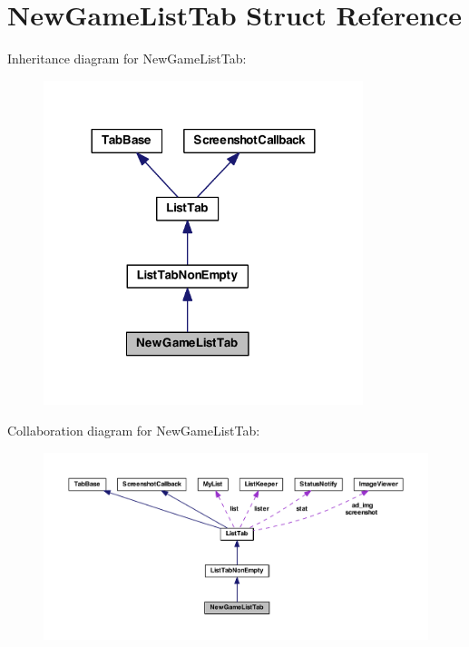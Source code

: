\hypertarget{struct_new_game_list_tab}{\section{New\-Game\-List\-Tab Struct Reference}
\label{struct_new_game_list_tab}
}


Inheritance diagram for New\-Game\-List\-Tab\-:
\nopagebreak
\begin{figure}[H]
\begin{center}
\leavevmode
\includegraphics[width=264pt]{struct_new_game_list_tab__inherit__graph}
\end{center}
\end{figure}


Collaboration diagram for New\-Game\-List\-Tab\-:
\nopagebreak
\begin{figure}[H]
\begin{center}
\leavevmode
\includegraphics[width=350pt]{struct_new_game_list_tab__coll__graph}
\end{center}
\end{figure}
